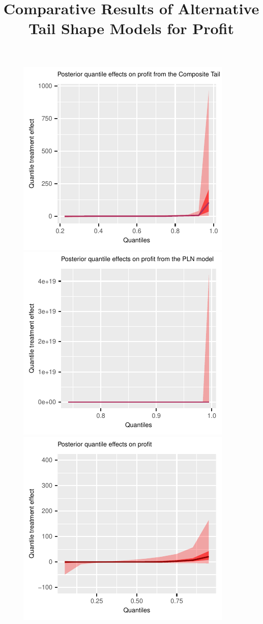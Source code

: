 \documentclass[AER]{AEA}
\begin{document}
\clearpage





 
  \begin{figure}[h!]
  \centering
  \title{Comparative Results of Alternative Tail Shape Models for Profit}
    \includegraphics{posterior_parent_quantile_TEs_profit_composite.pdf}\\
    \includegraphics{posterior_parent_quantile_TEs_profit_PLN.pdf}\\
          \includegraphics{posterior_parent_quantile_TEs_profit_lognormal.pdf}


\end{figure}
\end{document}
